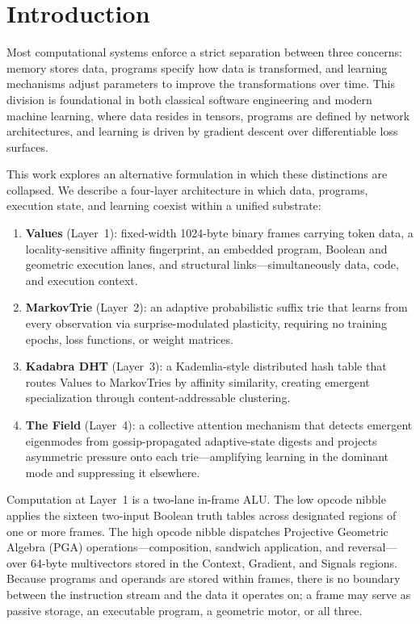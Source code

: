 \section{Introduction}

Most computational systems enforce a strict separation between three
concerns: memory stores data, programs specify how data is transformed,
and learning mechanisms adjust parameters to improve the transformations
over time.  This division is foundational in both classical software
engineering and modern machine learning, where data resides in tensors,
programs are defined by network architectures, and learning is driven by
gradient descent over differentiable loss surfaces.

This work explores an alternative formulation in which these distinctions
are collapsed.  We describe a four-layer architecture in which data,
programs, execution state, and learning coexist within a unified
substrate:

\begin{enumerate}[nosep]
  \item \textbf{Values} (Layer~1): fixed-width 1024-byte binary frames
        carrying token data, a locality-sensitive affinity fingerprint,
        an embedded program, Boolean and geometric execution lanes, and
        structural links---simultaneously data, code, and execution
        context.
  \item \textbf{MarkovTrie} (Layer~2): an adaptive probabilistic suffix
        trie that learns from every observation via surprise-modulated
        plasticity, requiring no training epochs, loss functions, or
        weight matrices.
  \item \textbf{Kadabra DHT} (Layer~3): a Kademlia-style distributed
        hash table that routes Values to MarkovTries by affinity
        similarity, creating emergent specialization through
        content-addressable clustering.
  \item \textbf{The Field} (Layer~4): a collective attention mechanism
        that detects emergent eigenmodes from gossip-propagated
        adaptive-state digests and projects asymmetric pressure onto
        each trie---amplifying learning in the dominant mode and
        suppressing it elsewhere.
\end{enumerate}

Computation at Layer~1 is a two-lane in-frame ALU.  The low opcode
nibble applies the sixteen two-input Boolean truth tables across
designated regions of one or more frames.  The high opcode nibble
dispatches Projective Geometric Algebra (PGA) operations---composition,
sandwich application, and reversal---over 64-byte multivectors stored in
the Context, Gradient, and Signals regions.  Because programs and
operands are stored within frames, there is no boundary between the
instruction stream and the data it operates on; a frame may serve as
passive storage, an executable program, a geometric motor, or all three.

